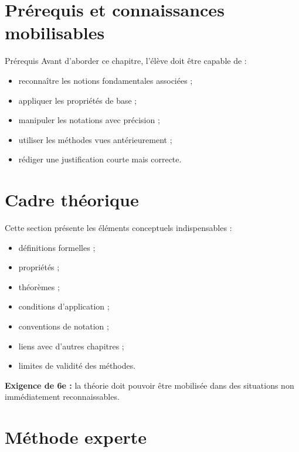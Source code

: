 \documentclass[11pt,a4paper]{article}
\begin{document}
\section{Prérequis et connaissances mobilisables}

\begin{cadregris}{Prérequis}
Avant d’aborder ce chapitre, l’élève doit être capable de :
\begin{itemize}
    \item reconnaître les notions fondamentales associées ;
    \item appliquer les propriétés de base ;
    \item manipuler les notations avec précision ;
    \item utiliser les méthodes vues antérieurement ;
    \item rédiger une justification courte mais correcte.
\end{itemize}
\end{cadregris}

\section{Cadre théorique}

\begin{cadretheorie}
Cette section présente les éléments conceptuels indispensables :

\begin{itemize}
    \item définitions formelles ;
    \item propriétés ;
    \item théorèmes ;
    \item conditions d’application ;
    \item conventions de notation ;
    \item liens avec d’autres chapitres ;
    \item limites de validité des méthodes.
\end{itemize}

\medskip

\textbf{Exigence de 6e :} la théorie doit pouvoir être mobilisée dans des situations non immédiatement reconnaissables.
\end{cadretheorie}

\section{Méthode experte}
\end{document}
